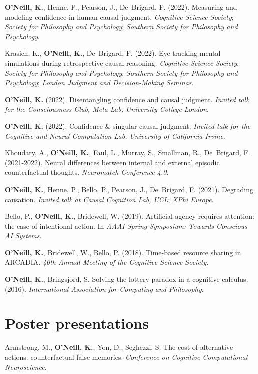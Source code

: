 \textbf{O'Neill, K.}, Henne, P., Pearson, J., De~Brigard,
F. (2022). Measuring and modeling confidence in human causal
judgment. \emph{Cognitive Science Society}; \emph{Society for
Philosophy and Psychology}; \emph{Southern Society for Philosophy and
Psychology}.

Krasich, K., \textbf{O'Neill, K.}, De~Brigard, F. (2022). Eye tracking
mental simulations during retrospective causal
reasoning. \emph{Cognitive Science Society}; \emph{Society for
Philosophy and Psychology}; \emph{Southern Society for Philosophy and
Psychology}; \emph{London Judgment and Decision-Making Seminar}.

\textbf{O'Neill, K.} (2022). Disentangling confidence and causal
judgment. \emph{Invited talk for the Consciousness Club, Meta Lab,
University College London}.

\textbf{O'Neill, K.} (2022). Confidence \& singular causal
judgment. \emph{Invited talk for the Cognitive and Neural Computation
Lab, University of California Irvine}.

Khoudary, A., \textbf{O’Neill, K.}, Faul, L., Murray, S., Smallman,
R., De~Brigard, F. (2021-2022). Neural differences between internal
and external episodic counterfactual thoughts. \emph{Neuromatch
Conference 4.0}.

\textbf{O'Neill, K.}, Henne, P., Bello, P., Pearson, J., De~Brigard,
F. (2021). Degrading causation. \emph{Invited talk at Causal Cognition
Lab, UCL}; \emph{XPhi Europe}.

Bello, P., \textbf{O'Neill, K.}, Bridewell, W. (2019). Artificial
agency requires attention: the case of intentional action. In
\emph{AAAI Spring Symposium: Towards Conscious AI Systems}.

\textbf{O'Neill, K.}, Bridewell, W., Bello, P. (2018). Time-based
resource sharing in ARCADIA. \emph{40th Annual Meeting of the
Cognitive Science Society}.

\textbf{O’Neill, K.}, Bringsjord, S. Solving the lottery paradox in a
cognitive calculus. (2016). \emph{International Association for
Computing and Philosophy}.


\line\section{Poster presentations}

Armstrong, M., \textbf{O'Neill, K.}, Yon, D., Seghezzi, S. The cost of
alternative actions: counterfactual false memories. \emph{Conference
on Cognitive Computational Neuroscience}.

